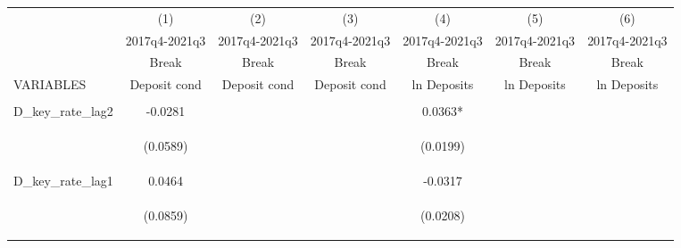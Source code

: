 \documentclass[]{article}
\begin{document}
\begin{center}
\begin{tabular}{lcccccc} \hline
 & (1) & (2) & (3) & (4) & (5) & (6) \\
 & 2017q4-2021q3 & 2017q4-2021q3 & 2017q4-2021q3 & 2017q4-2021q3 & 2017q4-2021q3 & 2017q4-2021q3 \\
 & Break & Break & Break & Break & Break & Break \\
VARIABLES & Deposit cond & Deposit cond & Deposit cond & ln Deposits & ln Deposits & ln Deposits \\ \hline
\vspace{4pt} & \begin{footnotesize}\end{footnotesize} & \begin{footnotesize}\end{footnotesize} & \begin{footnotesize}\end{footnotesize} & \begin{footnotesize}\end{footnotesize} & \begin{footnotesize}\end{footnotesize} & \begin{footnotesize}\end{footnotesize} \\
D\_key\_rate\_lag2 & -0.0281 &  &  & 0.0363* &  &  \\
\vspace{4pt} & \begin{footnotesize}(0.0589)\end{footnotesize} & \begin{footnotesize}\end{footnotesize} & \begin{footnotesize}\end{footnotesize} & \begin{footnotesize}(0.0199)\end{footnotesize} & \begin{footnotesize}\end{footnotesize} & \begin{footnotesize}\end{footnotesize} \\
D\_key\_rate\_lag1 & 0.0464 &  &  & -0.0317 &  &  \\
\vspace{4pt} & \begin{footnotesize}(0.0859)\end{footnotesize} & \begin{footnotesize}\end{footnotesize} & \begin{footnotesize}\end{footnotesize} & \begin{footnotesize}(0.0208)\end{footnotesize} & \begin{footnotesize}\end{footnotesize} & \begin{footnotesize}\end{footnotesize} \\

\end{tabular}
\end{center}
\end{document}

